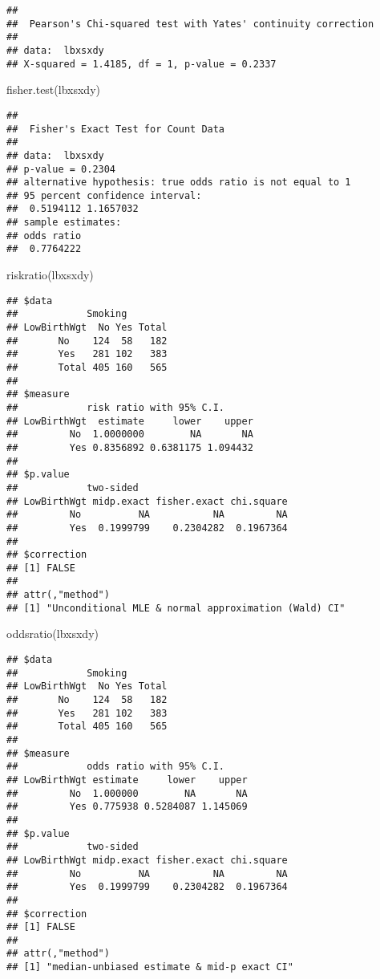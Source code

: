 \documentclass[
]{article}
\newenvironment{Shaded}{\begin{snugshade}}{\end{snugshade}}
\newcommand{\FunctionTok}[1]{\textcolor[rgb]{0.00,0.00,0.00}{#1}}
\newcommand{\NormalTok}[1]{#1}
\begin{document}
\begin{verbatim}
## 
##  Pearson's Chi-squared test with Yates' continuity correction
## 
## data:  lbxsxdy
## X-squared = 1.4185, df = 1, p-value = 0.2337
\end{verbatim}

\begin{Shaded}
\begin{Highlighting}[]
\FunctionTok{fisher.test}\NormalTok{(lbxsxdy)}
\end{Highlighting}
\end{Shaded}

\begin{verbatim}
## 
##  Fisher's Exact Test for Count Data
## 
## data:  lbxsxdy
## p-value = 0.2304
## alternative hypothesis: true odds ratio is not equal to 1
## 95 percent confidence interval:
##  0.5194112 1.1657032
## sample estimates:
## odds ratio 
##  0.7764222
\end{verbatim}

\begin{Shaded}
\begin{Highlighting}[]
\FunctionTok{riskratio}\NormalTok{(lbxsxdy)}
\end{Highlighting}
\end{Shaded}

\begin{verbatim}
## $data
##            Smoking
## LowBirthWgt  No Yes Total
##       No    124  58   182
##       Yes   281 102   383
##       Total 405 160   565
## 
## $measure
##            risk ratio with 95% C.I.
## LowBirthWgt  estimate     lower    upper
##         No  1.0000000        NA       NA
##         Yes 0.8356892 0.6381175 1.094432
## 
## $p.value
##            two-sided
## LowBirthWgt midp.exact fisher.exact chi.square
##         No          NA           NA         NA
##         Yes  0.1999799    0.2304282  0.1967364
## 
## $correction
## [1] FALSE
## 
## attr(,"method")
## [1] "Unconditional MLE & normal approximation (Wald) CI"
\end{verbatim}

\begin{Shaded}
\begin{Highlighting}[]
\FunctionTok{oddsratio}\NormalTok{(lbxsxdy)}
\end{Highlighting}
\end{Shaded}

\begin{verbatim}
## $data
##            Smoking
## LowBirthWgt  No Yes Total
##       No    124  58   182
##       Yes   281 102   383
##       Total 405 160   565
## 
## $measure
##            odds ratio with 95% C.I.
## LowBirthWgt estimate     lower    upper
##         No  1.000000        NA       NA
##         Yes 0.775938 0.5284087 1.145069
## 
## $p.value
##            two-sided
## LowBirthWgt midp.exact fisher.exact chi.square
##         No          NA           NA         NA
##         Yes  0.1999799    0.2304282  0.1967364
## 
## $correction
## [1] FALSE
## 
## attr(,"method")
## [1] "median-unbiased estimate & mid-p exact CI"
\end{verbatim}
\end{document}
